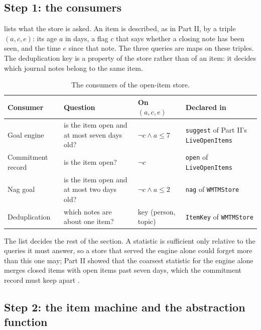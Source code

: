 \documentclass[11pt]{article}
\newcommand{\code}[1]{\texttt{#1}}
\theoremstyle{definition}
\theoremstyle{plain}
\begin{document}
\subsection{Step 1: the consumers}\label{sec:consumers}

 lists what the store is asked. An item is described, as in Part II, by a
triple $(a,c,e)$: its age $a$ in days, a flag $c$ that says whether a closing note has been seen,
and the time $e$ since that note. The three queries are maps on these triples. The deduplication
key is a property of the store rather than of an item: it decides which journal notes belong to the
same item.

\begin{table}[ht]
\centering\small
\begin{tabularx}{\textwidth}{>{\raggedright\arraybackslash}p{2.6cm}>{\raggedright\arraybackslash}p{4.0cm}>{\raggedright\arraybackslash}p{2.3cm}>{\raggedright\arraybackslash}X}
\toprule
Consumer & Question & On $(a,c,e)$ & Declared in\\
\midrule
Goal engine & is the item open and at most seven days old? & $\neg c\wedge a\le 7$ &
\code{suggest} of Part II's \code{LiveOpenItems}\\
Commitment record & is the item open? & $\neg c$ & \code{open} of \code{LiveOpenItems}\\
Nag goal & is the item open and at most two days old? & $\neg c\wedge a\le 2$ & \code{nag} of
\code{WMTMStore}\\
Deduplication & which notes are about one item? & key (person, topic) & \code{ItemKey} of
\code{WMTMStore}\\
\bottomrule
\end{tabularx}
\caption{The consumers of the open-item store.}\label{tab:consumers}
\end{table}

The list decides the rest of the section. A statistic is sufficient only relative to the queries it
must answer, so a store that served the engine alone could forget more than this one may; Part II
showed that the coarsest statistic for the engine alone merges closed items with open items past
seven days, which the commitment record must keep apart \cite[Section~6.1]{part2}.

\subsection{Step 2: the item machine and the abstraction function}\label{sec:abstraction}
\end{document}
